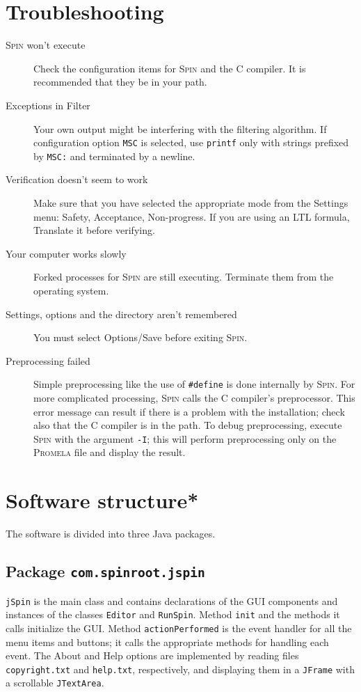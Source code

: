 \documentclass[11pt]{article}
\newcommand{\spn}{\textsc{Spin}}
\newcommand{\prm}{\textsc{Promela}}
\newcommand{\p}[1]{\texttt{#1}}
\newcommand{\bu}[1]{\textsf{#1}}
\begin{document}
\section{Troubleshooting}
\begin{description}
\item[\spn{} won't execute] Check the configuration items
for \spn{} and the C compiler.
It is recommended that they be in your path.
\item[Exceptions in Filter] Your own output might be
interfering with the filtering algorithm.
If configuration option \p{MSC} is selected, use \p{printf} only with strings
prefixed by \p{MSC:} and terminated by a newline.
\item[Verification doesn't seem to work]
Make sure that you have selected the appropriate mode
from the \bu{Settings} menu:
\bu{Safety}, \bu{Acceptance}, \bu{Non-progress}.
If you are using an LTL formula,
\bu{Translate} it before verifying.
\item[Your computer works slowly] Forked processes for \spn{} are still executing.
Terminate them from the operating system.
\item[Settings, options and the directory aren't remembered]
You must select \bu{Options/Save} before exiting \spn{}.
\item[Preprocessing failed] Simple preprocessing like the use of \verb=#define= 
is done internally by \spn{}. For more complicated processing, \spn{} calls the 
C compiler's preprocessor. This error message can result if there is a problem
with the installation; check also that the C compiler is in the path.
To debug preprocessing, execute \spn{} with the argument \p{-I};
this will perform preprocessing only on the \prm{} file and display the result. 
\end{description}

\newpage

\section{Software structure*}
The software is divided into three Java packages.

\subsection{Package \p{com.spinroot.jspin}}
\p{jSpin} is the main class and contains declarations
of the GUI components and instances
of the classes \p{Editor} and \p{RunSpin}.
Method \p{init} and the methods it calls initialize the GUI.
Method \p{action\-Per\-formed} is the event handler for all the menu items
and buttons; it calls the appropriate methods for handling each event.
The \bu{About} and \bu{Help} options are implemented by reading files
\p{copyright.txt} and \p{help.txt}, respectively, and displaying
them in a \p{JFrame} with a scrollable \p{JTextArea}.
\end{document}
